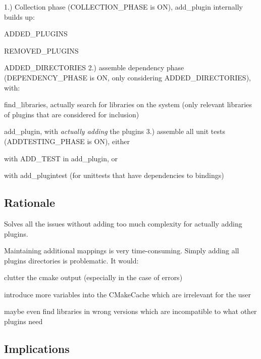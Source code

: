 1.) Collection phase ({\ttfamily C\+O\+L\+L\+E\+C\+T\+I\+O\+N\+\_\+\+P\+H\+A\+SE} is {\ttfamily ON}), add\+\_\+plugin internally builds up\+:
\begin{DoxyItemize}
\item {\ttfamily A\+D\+D\+E\+D\+\_\+\+P\+L\+U\+G\+I\+NS}
\item {\ttfamily R\+E\+M\+O\+V\+E\+D\+\_\+\+P\+L\+U\+G\+I\+NS}
\item {\ttfamily A\+D\+D\+E\+D\+\_\+\+D\+I\+R\+E\+C\+T\+O\+R\+I\+ES} 2.) assemble dependency phase ({\ttfamily D\+E\+P\+E\+N\+D\+E\+N\+C\+Y\+\_\+\+P\+H\+A\+SE} is {\ttfamily ON}, only considering {\ttfamily A\+D\+D\+E\+D\+\_\+\+D\+I\+R\+E\+C\+T\+O\+R\+I\+ES}), with\+:
\item find\+\_\+libraries, actually search for libraries on the system (only relevant libraries of plugins that are considered for inclusion)
\item add\+\_\+plugin, with {\itshape actually adding} the plugins 3.) assemble all unit tests ({\ttfamily A\+D\+D\+T\+E\+S\+T\+I\+N\+G\+\_\+\+P\+H\+A\+SE} is {\ttfamily ON}), either
\item with {\ttfamily A\+D\+D\+\_\+\+T\+E\+ST} in {\ttfamily add\+\_\+plugin}, or
\item with {\ttfamily add\+\_\+plugintest} (for unittests that have dependencies to bindings)
\end{DoxyItemize}

\subsection*{Rationale}

Solves all the issues without adding too much complexity for actually adding plugins.

Maintaining additional mappings is very time-\/consuming. Simply adding all plugins directories is problematic. It would\+:


\begin{DoxyItemize}
\item clutter the cmake output (especially in the case of errors)
\item introduce more variables into the C\+Make\+Cache which are irrelevant for the user
\item maybe even find libraries in wrong versions which are incompatible to what other plugins need
\end{DoxyItemize}

\subsection*{Implications}


